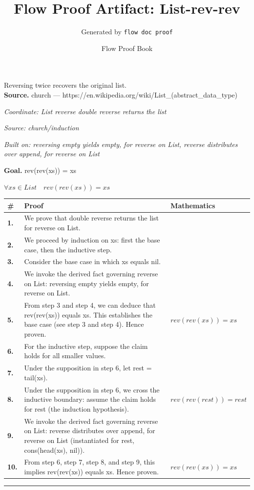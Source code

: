 \documentclass[11pt]{article}
\title{Flow Proof Artifact: List-rev-rev}
\author{Generated by \texttt{flow doc proof}}
\date{Flow Proof Book}
\theoremstyle{definition}
\begin{document}
\maketitle
Reversing twice recovers the original list.\\[0.5em]
\textbf{Source.} church — https://en.wikipedia.org/wiki/List\_(abstract\_data\_type)\\[0.5em]
\bigskip
{}\par
\smallskip\noindent\textit{Coordinate: List \cdot reverse \cdot double reverse returns the list}\par
\smallskip\noindent\textit{Source: church/induction}\par
\smallskip\noindent\textit{Built on: reversing empty yields empty, for reverse on List, reverse distributes over append, for reverse on List}\par
\medskip
\noindent\textbf{Goal.} rev(rev(xs)) = xs\par
\noindent$\displaystyle \forall xs \in List\quad rev(rev(xs)) = xs$\par
\medskip
\noindent
\begin{tabular}{@{} >{\raggedright\arraybackslash}p{} >{\raggedright\arraybackslash}p{} >{\raggedleft\arraybackslash}p{} @{}}
\textbf{\#} & \textbf{Proof} & \textbf{Mathematics} \\
\midrule
\textbf{1.} & We prove that double reverse returns the list for reverse on List. & \\[0.45em]
\textbf{2.} & We proceed by induction on xs: first the base case, then the inductive step. & \\[0.45em]
\textbf{3.} & Consider the base case in which xs  equals  nil. & \\[0.45em]
\textbf{4.} & We invoke the derived fact governing reverse on List: reversing empty yields empty, for reverse on List. & \\[0.45em]
\textbf{5.} & From step 3 and step 4, we can deduce that rev(rev(xs)) equals xs. This establishes the base case (see step 3 and step 4). Hence proven. & $\displaystyle rev(rev(xs)) = xs$ \\[0.45em]
\textbf{6.} & For the inductive step, suppose the claim holds for all smaller values. & \\[0.45em]
\textbf{7.} & Under the supposition in step 6, let rest = tail(xs). & \\[0.45em]
\textbf{8.} & Under the supposition in step 6, we cross the inductive boundary: assume the claim holds for rest (the induction hypothesis). & $\displaystyle rev(rev(rest)) = rest$ \\[0.45em]
\textbf{9.} & We invoke the derived fact governing reverse on List: reverse distributes over append, for reverse on List (instantiated for rest, cons(head(xs), nil)). & \\[0.45em]
\textbf{10.} & From step 6, step 7, step 8, and step 9, this implies rev(rev(xs)) equals xs. Hence proven. & $\displaystyle rev(rev(xs)) = xs$ \\[0.45em]
\bottomrule
\end{tabular}
\label{thm:List-reverse-double_reverse_returns_the_list}
\par\medskip\hrule
\end{document}
